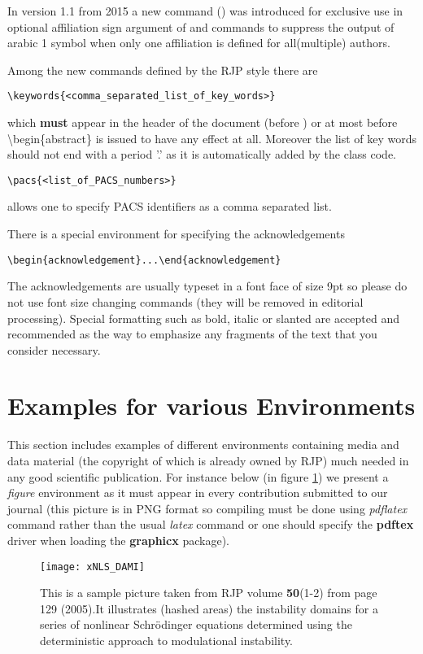 \documentclass[myclassdoc,debug]{rjparticle}
\begin{document}
In version 1.1 from 2015 a new command () was introduced for exclusive use in optional affiliation sign argument of  and  commands to suppress the output of arabic 1 symbol when only one affiliation is defined for all(multiple) authors.

Among the new commands defined by the RJP style there are 
\begin{lstlisting}
\keywords{<comma_separated_list_of_key_words>}
\end{lstlisting}
which \textbf{must} appear in the header of the document (before ) or at most before \textbackslash begin\{abstract\} is issued to have any effect at all. Moreover the list of key words should not end with a period '.' as it is automatically added by the class code.
\begin{lstlisting}
\pacs{<list_of_PACS_numbers>}
\end{lstlisting}
allows one to specify PACS identifiers as a comma separated list.

There is a special environment for specifying the acknowledgements
\begin{lstlisting}
\begin{acknowledgement}...\end{acknowledgement}
\end{lstlisting}
The acknowledgements are usually typeset in a font face of size 9pt so please do not use font size changing commands (they will be removed in editorial processing). Special formatting such as bold, italic or slanted are accepted and recommended as the way to emphasize any fragments of the text that you consider necessary.

\section{Examples for various Environments}

This section includes examples of different environments containing media and data material (the copyright of which is already owned by RJP) much needed in any good scientific publication. For instance below (in figure \ref{pic1}) we present a \textit{figure} environment as it must appear in every contribution submitted to our journal (this picture is in PNG format so compiling must be done using \textit{pdflatex} command rather than the usual \textit{latex} command or one should specify the \textbf{pdftex} driver when loading the \textbf{graphicx} package).
\begin{figure}[h!tb]
\centering
\texttt{[image: xNLS\_DAMI]}
\caption{This is a sample picture taken from RJP volume \textbf{50}(1-2) from page 129 (2005).It illustrates (hashed areas) the instability domains for a series of nonlinear Schr\"odinger equations determined using the deterministic approach to modulational instability.}
\label{pic1}
\end{figure}
\end{document}
